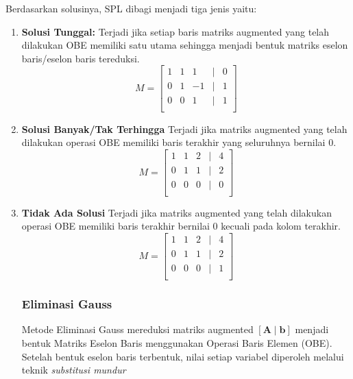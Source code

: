 \documentclass[12pt]{article}
\begin{document}
Berdasarkan solusinya, SPL dibagi menjadi tiga jenis yaitu:
\begin{enumerate}
    \item \textbf{Solusi Tunggal:} Terjadi jika setiap baris matriks augmented yang telah dilakukan OBE memiliki satu utama sehingga menjadi bentuk matriks eselon baris/eselon baris tereduksi.
    \begin{equation}
    M = 
    \begin{bmatrix}
        1 & 1 & 1 & \mid & 0 \\
        0 & 1 & -1 & \mid & 1 \\
        0 & 0 & 1 & \mid & 1 \\
    \end{bmatrix}
    \end{equation}
    \item \textbf{Solusi Banyak/Tak Terhingga} Terjadi jika matriks augmented yang telah dilakukan operasi OBE memiliki baris terakhir yang seluruhnya bernilai 0.
    \begin{equation}
    M = 
    \begin{bmatrix}
        1 & 1 & 2 & \mid & 4 \\
        0 & 1 & 1 & \mid & 2 \\
        0 & 0 & 0 & \mid & 0 \\
    \end{bmatrix}
    \end{equation}
    \item \textbf{Tidak Ada Solusi } Terjadi jika matriks augmented yang telah dilakukan operasi OBE memiliki baris terakhir bernilai 0 kecuali pada kolom terakhir.
    \begin{equation}
    M = 
    \begin{bmatrix}
        1 & 1 & 2 & \mid & 4 \\
        0 & 1 & 1 & \mid & 2 \\
        0 & 0 & 0 & \mid & 1 \\
    \end{bmatrix}
    \end{equation}

\subsubsection{Eliminasi Gauss}
Metode Eliminasi Gauss mereduksi matriks augmented $[\mathbf{A} \mid \mathbf{b}]$ menjadi bentuk Matriks Eselon Baris menggunakan Operasi Baris Elemen (OBE). Setelah bentuk eselon baris terbentuk, nilai setiap variabel diperoleh melalui teknik \textit{substitusi mundur}


\end{enumerate}
\end{document}
